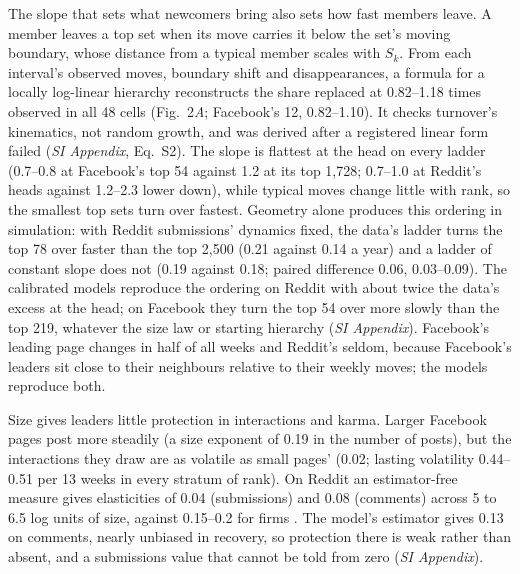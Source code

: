 \documentclass[9pt,twocolumn,twoside]{pnas-new}
\begin{document}
The slope that sets what newcomers bring also sets how fast members leave. A member leaves a top set when its move carries it below the set's moving boundary, whose distance from a typical member scales with $S_k$. From each interval's observed moves, boundary shift and disappearances, a formula for a locally log-linear hierarchy reconstructs the share replaced at 0.82--1.18 times observed in all 48 cells (Fig.~2\textit{A}; Facebook's 12, 0.82--1.10). It checks turnover's kinematics, not random growth, and was derived after a registered linear form failed (\textit{SI Appendix}, Eq.~S2). The slope is flattest at the head on every ladder (0.7--0.8 at Facebook's top 54 against 1.2 at its top 1,728; 0.7--1.0 at Reddit's heads against 1.2--2.3 lower down), while typical moves change little with rank, so the smallest top sets turn over fastest. Geometry alone produces this ordering in simulation: with Reddit submissions' dynamics fixed, the data's ladder turns the top 78 over faster than the top 2,500 (0.21 against 0.14 a year) and a ladder of constant slope does not (0.19 against 0.18; paired difference 0.06, 0.03--0.09). The calibrated models reproduce the ordering on Reddit with about twice the data's excess at the head; on Facebook they turn the top 54 over more slowly than the top 219, whatever the size law or starting hierarchy (\textit{SI Appendix}). Facebook's leading page changes in half of all weeks and Reddit's seldom, because Facebook's leaders sit close to their neighbours relative to their weekly moves; the models reproduce both.

Size gives leaders little protection in interactions and karma. Larger Facebook pages post more steadily (a size exponent of 0.19 in the number of posts), but the interactions they draw are as volatile as small pages' (0.02; lasting volatility 0.44--0.51 per 13 weeks in every stratum of rank). On Reddit an estimator-free measure gives elasticities of 0.04 (submissions) and 0.08 (comments) across 5 to 6.5 log units of size, against 0.15--0.2 for firms \cite{stanley1996,riccaboni2008}. The model's estimator gives 0.13 on comments, nearly unbiased in recovery, so protection there is weak rather than absent, and a submissions value that cannot be told from zero (\textit{SI Appendix}).
\end{document}
